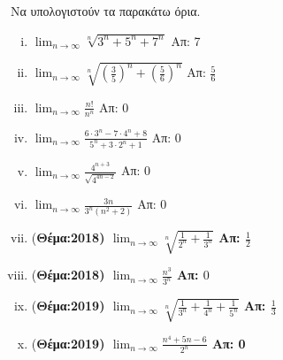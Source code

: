 Να υπολογιστούν τα παρακάτω όρια.

\begin{enumerate}[i)]
  \item $ \lim_{n \to \infty} \sqrt[n]{3^{n}+5^{n}+7^{n}}  $ \hfill Απ: 7 
  \item $ \lim_{n \to \infty} \sqrt[n]{\left(\frac{3}{5} \right)^{n} + 
    \left(\frac{5}{6} \right)^{n}} $ \hfill Απ: $ \frac{5}{6} $ 
  \item $ \lim_{n \to \infty} \frac{n!}{n^{n}} $ \hfill Απ: 0  
  \item $ \lim_{n \to \infty} \frac{6\cdot 3^{n}-7 \cdot 4^{n}+8}
    {5^{n}+3\cdot 2^{n}+1} $ \hfill Απ: 0  
  \item $ \lim_{n \to \infty} \frac{4^{n+3}}{\sqrt{4^{4n-2}}} $ \hfill Απ: 0  
  \item $ \lim_{n \to \infty} \frac{3n}{3^{n}(n^{2}+2)} $ \hfill Απ: 0  
  \item (\bfseries Θέμα:2018) $ \lim_{n \to \infty} \sqrt[n]{\frac{1}{2^{n}}+ 
    \frac{1}{3^{n}}} $ \hfill Απ: $ \frac{1}{2} $ 
  \item (\bfseries Θέμα:2018) $ \lim_{n \to \infty} \frac{n^{3}}{3^{n}} $ 
    \hfill Απ: $ 0 $
  \item (\bfseries Θέμα:2019) $ \lim_{n \to \infty} \sqrt[n]{\frac{1}{3^{n}} + 
    \frac{1}{4^{n}} + \frac{1}{5^{n}}} $ \hfill Απ: $ \frac{1}{3} $
  \item (\bfseries Θέμα:2019) $ \lim_{n \to \infty} \frac{n^{4}+5n-6}{2^{n}} $ 
    \hfill Απ: 0 
\end{enumerate}


